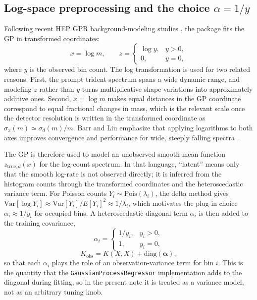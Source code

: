 \subsection{Log-space preprocessing and the choice \texorpdfstring{$\alpha=1/y$}{alpha=1/y}}

Following recent HEP GPR background-modeling studies
\cite{BarrLiu2025,Gandrakota2023}, the package fits the GP in transformed coordinates:
\begin{equation}
x = \log m,
\qquad
z =
\begin{cases}
\log y, & y>0, \\
0, & y=0,
\end{cases}
\end{equation}
where $y$ is the observed bin count. The log transformation is used for two related
reasons. First, the prompt trident spectrum spans a wide dynamic range, and modeling
$z$ rather than $y$ turns multiplicative shape variations into approximately additive
ones. Second, $x=\log m$ makes equal distances in the GP coordinate correspond to equal
fractional changes in mass, which is the relevant scale once the detector resolution is
written in the transformed coordinate as $\sigma_x(m)\simeq \sigma_d(m)/m$. Barr and
Liu emphasize that applying logarithms to both axes improves convergence and
performance for wide, steeply falling spectra \cite{BarrLiu2025}.

The GP is therefore used to model an unobserved smooth mean function
$z_{\mathrm{true},d}(x)$ for the log-count spectrum. In that language, ``latent'' means
only that the smooth log-rate is not observed directly; it is inferred from the
histogram counts through the transformed coordinates and the heteroscedastic variance
term. For Poisson counts $Y_i \sim \mathrm{Pois}(\lambda_i)$, the delta method gives
$\mathrm{Var}[\log Y_i]\approx \mathrm{Var}[Y_i]/E[Y_i]^2 \approx 1/\lambda_i$, which
motivates the plug-in choice $\alpha_i\approx 1/y_i$ for occupied bins. A
heteroscedastic diagonal term $\alpha_i$ is then added to the training covariance,
\begin{equation}
\alpha_i =
\begin{cases}
1/y_i, & y_i > 0, \\
1, & y_i = 0,
\end{cases}
\label{eq:alpha-oney}
\end{equation}
\begin{equation}
K_{\mathrm{obs}} = K(X,X) + \mathrm{diag}(\bm{\alpha}),
\end{equation}
so that each $\alpha_i$ plays the role of an observation-variance term for bin $i$.
This is the quantity that the \texttt{GaussianProcessRegressor} implementation adds to
the diagonal during fitting, so in the present note it is treated as a variance model,
not as an arbitrary tuning knob.

